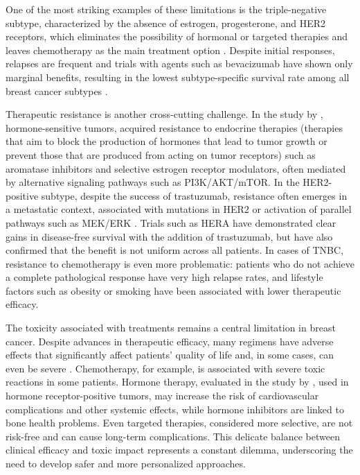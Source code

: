 One of the most striking examples of these limitations is the triple-negative 
subtype, characterized by the absence of estrogen, progesterone, and HER2 
receptors, which eliminates the possibility of hormonal or targeted therapies 
and leaves chemotherapy as the main treatment option \cite{Yin2020Triple-negative}. 
Despite initial responses, relapses are frequent and trials with agents such as 
bevacizumab have shown only marginal benefits, resulting in the lowest 
subtype-specific survival rate among all breast cancer subtypes 
\cite{diff_bca_usa_Howlader2018, Eroles2012Molecular}.

Therapeutic resistance is another cross-cutting challenge. In the study by
\textcite{Sun2017Risk}, hormone-sensitive tumors, acquired resistance to
endocrine therapies (therapies that aim to block the production of hormones
that lead to tumor growth or prevent those that are produced from acting on
tumor receptors) such as aromatase inhibitors and selective estrogen receptor
modulators, often mediated by alternative signaling pathways such as
PI3K/AKT/mTOR. In the HER2-positive subtype, despite the success of
trastuzumab, resistance often emerges in a metastatic context, associated with
mutations in HER2 or activation of parallel pathways such as MEK/ERK
\cite{Loibl2021Breast, Eroles2012Molecular}. Trials such as HERA have
demonstrated clear gains in disease-free survival with the addition of
trastuzumab, but have also confirmed that the benefit is not uniform across all
patients. In cases of TNBC, resistance to chemotherapy is even more
problematic: patients who do not achieve a complete pathological response have
very high relapse rates, and lifestyle factors such as obesity or smoking have
been associated with lower therapeutic efficacy.

The toxicity associated with treatments remains a central limitation in breast
cancer. Despite advances in therapeutic efficacy, many regimens have adverse
effects that significantly affect patients' quality of life and, in some cases,
can even be severe \cite{Loibl2021Breast}. Chemotherapy, for example, is
associated with severe toxic reactions in some patients. Hormone therapy,
evaluated in the study by \textcite{Sun2017Risk}, used in hormone
receptor-positive tumors, may increase the risk of cardiovascular complications
and other systemic effects, while hormone inhibitors are linked to bone health
problems. Even targeted therapies, considered more selective, are not risk-free
and can cause long-term complications. This delicate balance between clinical
efficacy and toxic impact represents a constant dilemma, underscoring the need
to develop safer and more personalized approaches.

